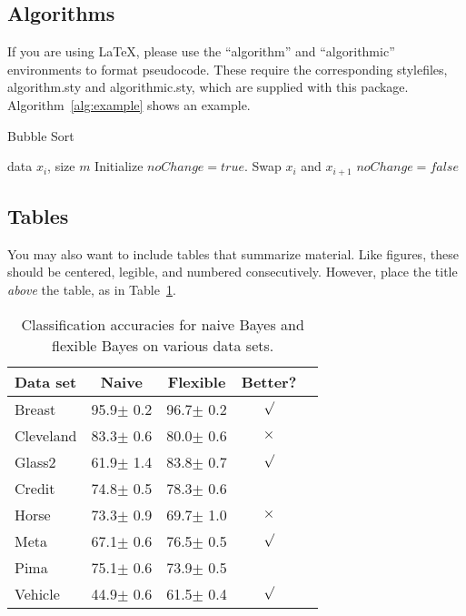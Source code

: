 \documentclass{article}
\begin{document}
\subsection{Algorithms}

If you are using \LaTeX, please use the ``algorithm'' and ``algorithmic'' 
environments to format pseudocode. These require 
the corresponding stylefiles, algorithm.sty and 
algorithmic.sty, which are supplied with this package. 
Algorithm~\ref{alg:example} shows an example. 

\begin{algorithm}[tb]
   \caption{Bubble Sort}
   \label{alg:example}
\begin{algorithmic}
    data $x_i$, size $m$
   \REPEAT
   \STATE Initialize $noChange = true$.
   \STATE Swap $x_i$ and $x_{i+1}$
   \STATE $noChange = false$
   \ENDIF
   \ENDFOR
\end{algorithmic}
\end{algorithm}
 
\subsection{Tables} 
 
You may also want to include tables that summarize material. Like 
figures, these should be centered, legible, and numbered consecutively. 
However, place the title {\it above\/} the table, as in 
Table~\ref{sample-table}.

\begin{table}[t]
\caption{Classification accuracies for naive Bayes and flexible 
Bayes on various data sets.}
\label{sample-table}
\vskip 0.15in
\begin{center}
\begin{small}
\begin{sc}
\begin{tabular}{lcccr}
\hline
\abovespace\belowspace
Data set & Naive & Flexible & Better? \\
\hline
\abovespace
Breast    & 95.9$\pm$ 0.2& 96.7$\pm$ 0.2& $\surd$ \\
Cleveland & 83.3$\pm$ 0.6& 80.0$\pm$ 0.6& $\times$\\
Glass2    & 61.9$\pm$ 1.4& 83.8$\pm$ 0.7& $\surd$ \\
Credit    & 74.8$\pm$ 0.5& 78.3$\pm$ 0.6&         \\
Horse     & 73.3$\pm$ 0.9& 69.7$\pm$ 1.0& $\times$\\
Meta      & 67.1$\pm$ 0.6& 76.5$\pm$ 0.5& $\surd$ \\
Pima      & 75.1$\pm$ 0.6& 73.9$\pm$ 0.5&         \\
\belowspace
Vehicle   & 44.9$\pm$ 0.6& 61.5$\pm$ 0.4& $\surd$ \\
\hline
\end{tabular}
\end{sc}
\end{small}
\end{center}
\vskip -0.1in
\end{table}
\end{document}
